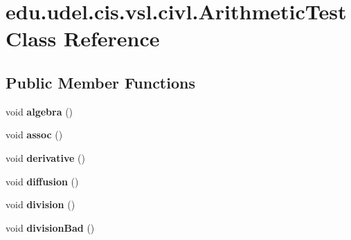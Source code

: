 \hypertarget{classedu_1_1udel_1_1cis_1_1vsl_1_1civl_1_1ArithmeticTest}{}\section{edu.\+udel.\+cis.\+vsl.\+civl.\+Arithmetic\+Test Class Reference}
\label{classedu_1_1udel_1_1cis_1_1vsl_1_1civl_1_1ArithmeticTest}
\subsection*{Public Member Functions}
\begin{DoxyCompactItemize}
\item 
\hypertarget{classedu_1_1udel_1_1cis_1_1vsl_1_1civl_1_1ArithmeticTest_ac945b3e6f833550805d597b2a037cac3}{}void {\bfseries algebra} ()\label{classedu_1_1udel_1_1cis_1_1vsl_1_1civl_1_1ArithmeticTest_ac945b3e6f833550805d597b2a037cac3}

\item 
\hypertarget{classedu_1_1udel_1_1cis_1_1vsl_1_1civl_1_1ArithmeticTest_a2e3c8d0db5f82f2ae74efa264af9c155}{}void {\bfseries assoc} ()\label{classedu_1_1udel_1_1cis_1_1vsl_1_1civl_1_1ArithmeticTest_a2e3c8d0db5f82f2ae74efa264af9c155}

\item 
\hypertarget{classedu_1_1udel_1_1cis_1_1vsl_1_1civl_1_1ArithmeticTest_aaa3b06883216bf5a158f979c2830a157}{}void {\bfseries derivative} ()\label{classedu_1_1udel_1_1cis_1_1vsl_1_1civl_1_1ArithmeticTest_aaa3b06883216bf5a158f979c2830a157}

\item 
\hypertarget{classedu_1_1udel_1_1cis_1_1vsl_1_1civl_1_1ArithmeticTest_a4cb1510a0e1e81636ae7ce444a414032}{}void {\bfseries diffusion} ()\label{classedu_1_1udel_1_1cis_1_1vsl_1_1civl_1_1ArithmeticTest_a4cb1510a0e1e81636ae7ce444a414032}

\item 
\hypertarget{classedu_1_1udel_1_1cis_1_1vsl_1_1civl_1_1ArithmeticTest_a5e721ba456c4ebacade44e8563fa51d8}{}void {\bfseries division} ()\label{classedu_1_1udel_1_1cis_1_1vsl_1_1civl_1_1ArithmeticTest_a5e721ba456c4ebacade44e8563fa51d8}

\item 
\hypertarget{classedu_1_1udel_1_1cis_1_1vsl_1_1civl_1_1ArithmeticTest_ab317737e8dc8cb5f2d3772f5b1cdb8e7}{}void {\bfseries division\+Bad} ()\label{classedu_1_1udel_1_1cis_1_1vsl_1_1civl_1_1ArithmeticTest_ab317737e8dc8cb5f2d3772f5b1cdb8e7}


\end{DoxyCompactItemize}
